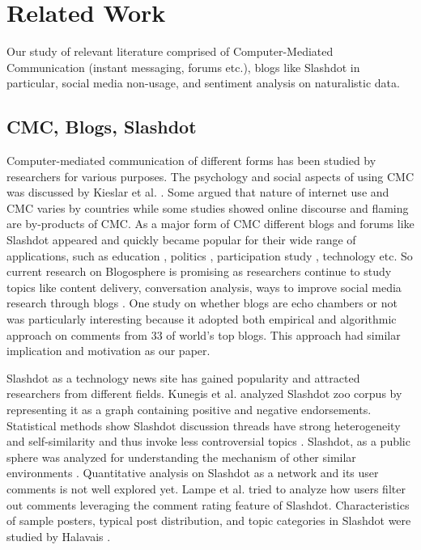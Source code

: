 \section{Related Work}
\label{sec:relatedwork}

Our study of relevant literature comprised of Computer-Mediated Communication (instant messaging, forums etc.), blogs like Slashdot in particular, social media non-usage, and sentiment analysis on naturalistic data. 

\subsection{CMC, Blogs, Slashdot}
Computer-mediated communication of different forms has been studied by researchers for various purposes. The psychology and social aspects of using CMC was discussed by Kieslar et al. \cite{kiesler1984social}. Some argued that nature of internet use and CMC varies by countries \cite{wellman2003social} while some studies \cite{lange2006your} showed online discourse and flaming are by-products of CMC. As a major form of CMC different blogs and forums like Slashdot appeared and quickly became popular for their wide range of applications, such as education \cite{duffy2006use, pinkman2005using,  williams2004exploring}, politics \cite{davis2009typing, koop2009political}, participation study \cite{gaonkar2008micro}, technology \cite{khabiri2009analyzing} etc. So current research on Blogosphere is promising as researchers continue to study topics like content delivery, conversation analysis, ways to improve social media research through blogs \cite{ferdig2004content, herring2005conversations, hookway2008entering}. One study \cite{gilbert2009blogs} on whether blogs are echo chambers or not was particularly interesting because it adopted both empirical and algorithmic approach on comments from 33 of world's top blogs. This approach had similar implication and motivation as our paper.

Slashdot as a technology news site has gained popularity and attracted researchers from different fields. Kunegis et al. \cite{kunegis2009slashdot} analyzed Slashdot zoo corpus by representing it as a graph containing positive and negative endorsements. Statistical methods show Slashdot discussion threads have strong heterogeneity and self-similarity and thus invoke less controversial topics \cite{gomez2008statistical}. Slashdot, as a public sphere was analyzed for understanding the mechanism of other similar environments \cite{baoill2000slashdot, poor2005mechanisms}. Quantitative analysis on Slashdot as a network and its user comments \cite{gomez2008statistical, kaltenbrunner2007description} is not well explored yet. Lampe et al. \cite{lampe2007follow} tried to analyze how users filter out comments leveraging the comment rating feature of Slashdot. Characteristics of sample posters, typical post distribution, and topic categories in Slashdot were studied by Halavais \cite{halavais2001slashdot}.


